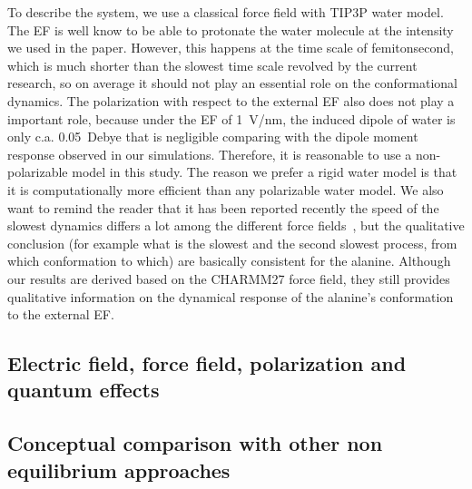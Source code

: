 \documentclass[a4paper,preprint,unsortedaddress,onecolumn]{revtex4-1}
\begin{document}
To describe the system, we use a classical force field with TIP3P water model.
The EF is well know to be able to protonate the water molecule at the
intensity we used in the paper. However, this happens at the time
scale of femitonsecond, which is much shorter than the slowest time
scale revolved by the current research, so on average it should not play an essential role on the conformational dynamics.
The polarization with respect to the external EF also does
not play a important role, because  under the EF of 1~V/nm, the induced dipole
of water is only c.a. 0.05~Debye that is negligible comparing with the
dipole moment response observed in our simulations.  Therefore, it is
reasonable to use a non-polarizable model in this study.  The reason we
prefer a rigid water model is that it is computationally more
efficient than any polarizable water model.  We also want to remind
the reader that it has been reported recently the speed of the slowest 
dynamics differs a lot among the different force
fields~\cite{vitalini2013speed}, but the qualitative conclusion (for
example what is the slowest and the second slowest process, from which
conformation to which) are basically consistent for the alanine.
Although our results are derived based on the CHARMM27 force field,
they still provides qualitative information on the dynamical response of the
alanine's conformation to the external EF.

\subsection{Electric field, force field, polarization and quantum effects}
\subsection{Conceptual comparison with other non equilibrium approaches}





\end{document}
